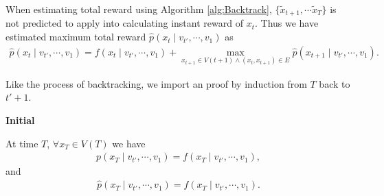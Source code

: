 \documentclass[12pt]{article}
\begin{document}

When estimating total reward using Algorithm \ref{alg:Backtrack}, $ \{ \tilde{x}_{t+1}, \cdots \tilde{x}_{T} \} $ is not predicted to apply into calculating instant reward of $ x_{t} $.
Thus we have estimated maximum total reward $ \hat{p}(x_{t} \mid v_{t'} , \cdots , v_{1} ) $ as 
\begin{equation}
\label{eq:defHatG}
\begin{aligned}
\hat{p}( x_{t} \mid v_{t'} , \cdots , v_{1} ) = f( x_{t} \mid v_{t'} , \cdots , v_{1} ) + \max_{ x_{t+1} \in V(t+1) \land ( x_{t}, x_{t+1} ) \in E } \hat{p}( x_{t+1} \mid v_{t'} , \cdots , v_{1} ).
\end{aligned}
\end{equation}





Like the process of backtracking, we import an proof by induction from $ T $ back to $ t' + 1 $.

\textbf{Initial}

At time $ T $, $ \forall x_{T} \in V(T) $ we have
\begin{equation}
\label{eq:eqT1}
\begin{aligned}
p( x_{T} \mid  v_{t'} , \cdots , v_{1} ) = f( x_{T} \mid v_{t'} , \cdots , v_{1} ),
\end{aligned}
\end{equation}
and
\begin{equation}
\label{eq:eqT2}
\begin{aligned}
\hat{p}( x_{T} \mid v_{t'} , \cdots , v_{1} ) = f(x_{T} \mid v_{t'} , \cdots , v_{1} ).
\end{aligned}
\end{equation}
\end{document}
